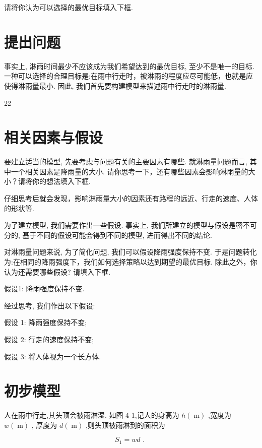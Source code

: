 \documentclass[10pt]{article}
\newcommand*\circled[1]{\tikz[baseline=(char.base)]{\node[shape=circle,draw,inner sep=1.5pt] (char) {\small #1};}}
\begin{document}
请将你认为可以选择的最优目标填入下框.

\section*{提出问题}

事实上, 淋雨时间最少不应该成为我们希望达到的最优目标, 至少不是唯一的目标. 一种可以选择的合理目标是:在雨中行走时，被淋雨的程度应尽可能低，也就是应使得淋雨量最小. 因此, 我们首先要构建模型来描述雨中行走时的淋雨量.

22

\section*{}

\section*{相关因素与假设}

要建立适当的模型, 先要考虑与问题有关的主要因素有哪些. 就淋雨量问题而言, 其中一个相关因素是降雨量的大小. 请你思考一下，还有哪些因素会影响淋雨量的大小？请将你的想法填入下框.

仔细思考后就会发现，影响淋雨量大小的因素还有路程的远近、行走的速度、人体的形状等.

为了建立模型, 我们需要作出一些假设. 事实上, 我们所建立的模型与假设是密不可分的, 基于不同的假设可能会得到不同的模型, 进而得出不同的结论.

对淋雨量问题来说, 为了简化问题, 我们可以假设降雨强度保持不变. 于是问题转化为:在相同的降雨强度下，我们如何选择策略以达到期望的最优目标. 除此之外，你认为还需要哪些假设? 请填入下框.

假设1: 降雨强度保持不变.

经过思考, 我们作出以下假设:

假设 1: 降雨强度保持不变;

假设 2: 行走的速度保持不变;

假设 3: 将人体视为一个长方体.

\section*{初步模型}

人在雨中行走,其头顶会被雨淋湿. 如图 4-1,记人的身高为 \(h\left( \mathrm{\;m}\right)\) ,宽度为 \(w\left( \mathrm{\;m}\right)\) , 厚度为 \(d\left( \mathrm{\;m}\right)\) ,则头顶被雨淋到的面积为

\[
{S}_{1} = {wd}\text{ . }
\]
  \circled{1} 
\end{document}
